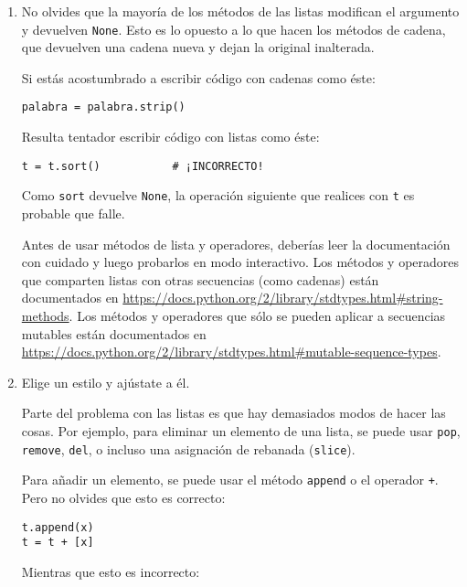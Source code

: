 \begin{enumerate}

\item No olvides que la mayoría de los métodos de las listas modifican el argumento y
devuelven {\tt None}. Esto es lo opuesto a lo que hacen los métodos de cadena,
que devuelven una cadena nueva y dejan la original inalterada.

Si estás acostumbrado a escribir código con cadenas como éste:

\beforeverb
\begin{verbatim}
palabra = palabra.strip()
\end{verbatim}
\afterverb

Resulta tentador escribir código con listas como éste:

\beforeverb
\begin{verbatim}
t = t.sort()           # ¡INCORRECTO!
\end{verbatim}
\afterverb


Como {\tt sort} devuelve {\tt None}, la operación
siguiente que realices con {\tt t} es probable que falle.

Antes de usar métodos de lista y operadores, deberías leer la
documentación con cuidado y luego probarlos en modo interactivo. Los
métodos y operadores que comparten listas con otras secuencias (como
cadenas) están documentados en
\url{https://docs.python.org/2/library/stdtypes.html#string-methods}.
Los métodos y operadores que sólo se pueden aplicar a secuencias mutables
están documentados en
\url{https://docs.python.org/2/library/stdtypes.html#mutable-sequence-types}.


\item Elige un estilo y ajústate a él.

Parte del problema con las listas es que hay demasiados
modos de hacer las cosas. Por ejemplo, para eliminar un elemento de
una lista, se puede usar {\tt pop}, {\tt remove}, {\tt del},
o incluso una asignación de rebanada ({\tt slice}).

Para añadir un elemento, se puede usar el método {\tt append} o
el operador {\tt +}. Pero no olvides que esto es correcto:

\beforeverb
\begin{verbatim}
t.append(x)
t = t + [x]
\end{verbatim}
\afterverb

Mientras que esto es incorrecto:


\end{enumerate}
